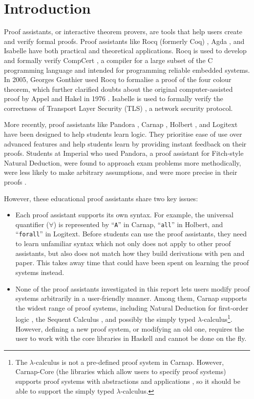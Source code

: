 \chapter{Introduction}
Proof assistants, or interactive theorem provers, are tools that help users create and verify formal proofs. Proof assistants like Rocq (formerly Coq) \cite{rocq}, Agda \cite{agda}, and Isabelle \cite{isabelle} have both practical and theoretical applications. Rocq is used to develop and formally verify CompCert \cite{leroy:2009}, a compiler for a large subset of the C programming language and intended for programming reliable embedded systems. In 2005, Georges Gonthier \cite{gonthier:2005} used Rocq to formalise a proof of the four colour theorem, which further clarified doubts about the original computer-assisted proof by Appel and Hakel in 1976 \cite{appel:1976}. Isabelle is used to formally verify the correctness of Transport Layer Security (TLS) \cite{paulson:1999}, a network security protocol.

More recently, proof assistants like Pandora \cite{pandora:2007, pandora}, Carnap \cite{carnap, carnap:2018}, Holbert \cite{oconnor:2022}, and Logitext \cite{yang:2022} have been designed to help students learn logic. They prioritise ease of use over advanced features and help students learn by providing instant feedback on their proofs. Students at Imperial who used Pandora, a proof assistant for Fitch-style \cite{fitch:1952} Natural Deduction, were found to approach exam problems more methodically, were less likely to make arbitrary assumptions, and were more precise in their proofs \cite{pandora:2007}.

However, these educational proof assistants share two key issues:
\begin{itemize}
    \item Each proof assistant supports its own syntax. For example, the universal quantifier ($\forall$) is represented by ``\lstinline{A}'' in Carnap, ``\lstinline{all}'' in Holbert, and ``\lstinline{forall}'' in Logitext. Before students can use the proof assistants, they need to learn unfamiliar syntax which not only does not apply to other proof assistants, but also does not match how they build derivations with pen and paper. This takes away time that could have been spent on learning the proof systems instead.
    \item None of the proof assistants investigated in this report lets users modify proof systems arbitrarily in a user-friendly manner. Among them, Carnap supports the widest range of proof systems, including Natural Deduction for first-order logic \cite{carnap:systems}, the Sequent Calculus \cite{carnap:systems}, and possibly the simply typed $\lambda$-calculus\footnote{The $\lambda$-calculus is not a pre-defined proof system in Carnap. However, Carnap-Core (the libraries which allow users to specify proof systems) supports proof systems with abstractions and applications \cite{carnap:2018}, so it should be able to support the simply typed $\lambda$-calculus.}. However, defining a new proof system, or modifying an old one, requires the user to work with the core libraries in Haskell and cannot be done on the fly.
\end{itemize}

